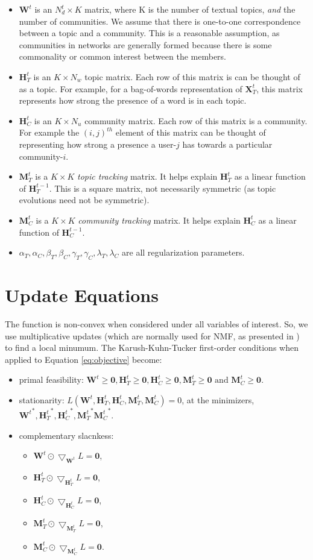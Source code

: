 \documentclass[a4paper,10pt]{article}
\newcommand{\W}{\textbf{W}^t}
\newcommand{\HT}{\textbf{H}^t_T}
\newcommand{\HC}{\textbf{H}^t_C}
\newcommand{\MT}{\textbf{M}^t_T}
\newcommand{\MC}{\textbf{M}^t_C}
\newcommand{\HTtt}{\textbf{H}^{t-1}_T}
\newcommand{\HCtt}{\textbf{H}^{t-1}_C}
\newcommand{\XT}{\textbf{X}^t_T}
\newcommand{\0}{\textbf{0}}
\begin{document}
\begin{itemize}
\item $\W$ is an $N_d^t \times K$ matrix, where K is the number of textual topics, \emph{and} the number
of communities.  We assume that there is one-to-one correspondence between a topic and a community.  This
is a reasonable assumption, as communities in networks are generally formed because there is some commonality
or common interest between the members.
\item  $\HT$ is an $K \times N_w$ topic matrix.  Each row of this matrix is can be thought of as a topic.
For example, for a bag-of-words representation of $\XT$, this matrix represents how strong the presence of
a word is in each topic.
\item $\HC$ is an $K \times N_u$ community matrix.  Each row of this matrix is a community.  For example
the $(i,j)^{th}$ element of this matrix can be thought of representing how strong a presence a user-$j$ 
has towards a particular community-$i$.
\item $\MT$ is a $K \times K$ \emph{topic tracking} matrix.  It helps explain $\HT$ as a linear function of $\HTtt$.
This is a square matrix, not necessarily symmetric (as topic evolutions need not be symmetric).
\item $\MC$ is a $K \times K$ \emph{community tracking} matrix.  It helps explain $\HC$ as a linear
function of $\HCtt$.
\item $\alpha_T, \alpha_C, \beta_T, \beta_C, \gamma_T, \gamma_C, \lambda_T, \lambda_C$ are all regularization
parameters.
\end{itemize}

\section{Update Equations}
The function is non-convex when considered under all variables of interest.  So, we use multiplicative updates
(which are normally used for NMF, as presented in \cite{lee_1999}) to find a local minumum.  The Karush-Kuhn-Tucker
first-order conditions when applied to Equation \ref{eq:objective} become:
\begin{itemize}
\item primal feasibility: $\W \geq \0, \HT \geq \0, \HC \geq \0, \MT \geq \0 \text{ and } \MC \geq \0$.
\item stationarity:  $L(\W,\HT,\HC,\MT,\MC) = 0$, at the minimizers, ${\W}^*, {\HT}^*, {\HC}^*, {\MT}^*
{\MC}^*$.
\item complementary slacnkess: 
\begin{itemize}
\item $\W \odot \bigtriangledown_{\W}L = \0$, 
\item $\HT \odot \bigtriangledown_{\HT}L = \0$,
\item $\HC \odot \bigtriangledown_{\HC}L = \0$, 
\item $\MT \odot \bigtriangledown_{\MT}L = \0$, 
\item $\MC \odot \bigtriangledown_{\MC}L = \0$.
\end{itemize}
\end{itemize}
\end{document}
